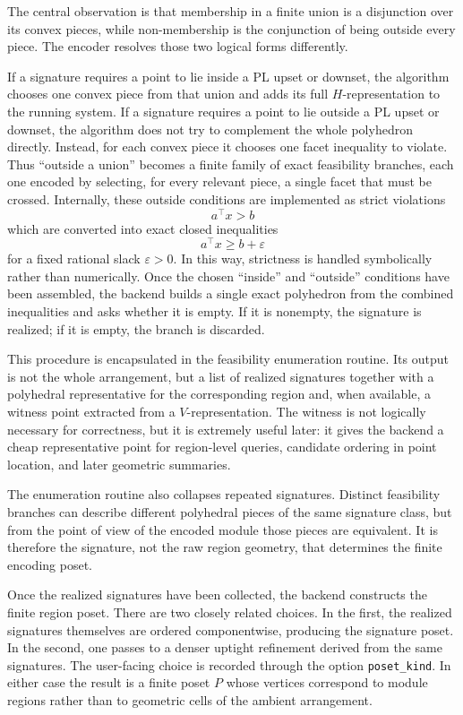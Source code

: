 \documentclass[11pt]{article}
\theoremstyle{definition}
\theoremstyle{remark}
\begin{document}
The central observation is that membership in a finite union is a disjunction over its convex pieces, while non-membership is the conjunction of being outside every piece.  The encoder resolves those two logical forms differently.

If a signature requires a point to lie inside a PL upset or downset, the algorithm chooses one convex piece from that union and adds its full \(H\)-representation to the running system.  If a signature requires a point to lie outside a PL upset or downset, the algorithm does not try to complement the whole polyhedron directly.  Instead, for each convex piece it chooses one facet inequality to violate.  Thus ``outside a union'' becomes a finite family of exact feasibility branches, each one encoded by selecting, for every relevant piece, a single facet that must be crossed.  Internally, these outside conditions are implemented as strict violations
\[
a^\top x > b
\]
which are converted into exact closed inequalities
\[
a^\top x \geq b + \varepsilon
\]
for a fixed rational slack \(\varepsilon > 0\).  In this way, strictness is handled symbolically rather than numerically.  Once the chosen ``inside'' and ``outside'' conditions have been assembled, the backend builds a single exact polyhedron from the combined inequalities and asks whether it is empty.  If it is nonempty, the signature is realized; if it is empty, the branch is discarded.

This procedure is encapsulated in the feasibility enumeration routine.  Its output is not the whole arrangement, but a list of realized signatures together with a polyhedral representative for the corresponding region and, when available, a witness point extracted from a \(V\)-representation.  The witness is not logically necessary for correctness, but it is extremely useful later: it gives the backend a cheap representative point for region-level queries, candidate ordering in point location, and later geometric summaries.  

The enumeration routine also collapses repeated signatures.  Distinct feasibility branches can describe different polyhedral pieces of the same signature class, but from the point of view of the encoded module those pieces are equivalent.  It is therefore the signature, not the raw region geometry, that determines the finite encoding poset.

Once the realized signatures have been collected, the backend constructs the finite region poset.  There are two closely related choices.  In the first, the realized signatures themselves are ordered componentwise, producing the signature poset.  In the second, one passes to a denser uptight refinement derived from the same signatures.  The user-facing choice is recorded through the option \texttt{poset\_kind}.  In either case the result is a finite poset \(P\) whose vertices correspond to module regions rather than to geometric cells of the ambient arrangement.
\end{document}
